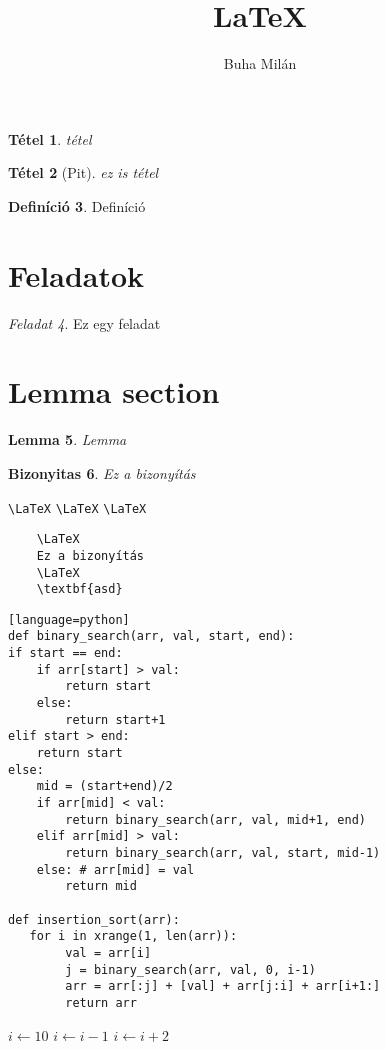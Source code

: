 \documentclass{article}
\title{\Huge{\LaTeX}}
\author{Buha Milán}
\theoremstyle{plain}
\newtheorem{tet}{Tétel}
\theoremstyle{definition}
\newtheorem{defin}[tet]{Definíció}
\theoremstyle{plain}
\newtheorem{lemma}[tet]{Lemma}
\theoremstyle{remark}
\newtheorem{feladat}[tet]{Feladat}
\theoremstyle{plain}
\newtheorem{bizonyitas}[tet]{Bizonyitas}
\begin{document}
	\maketitle
	\newpage
	
	\begin{tet}
	tétel
	\end{tet}
	
	\begin{tet}[Pit]
	ez is tétel
	\end{tet}
	
	\begin{defin}
	Definíció
	\end{defin}
	
	\section{Feladatok} \begin{feladat} Ez egy feladat \end{feladat}
	\section{Lemma section} \begin{lemma} Lemma \end{lemma}
	
	\begin{bizonyitas}
	Ez a bizonyítás
	\end{bizonyitas}
	
	\newpage
	\verb|\LaTeX| \verb|\LaTeX| \verb|\LaTeX|
	
	\begin{verbatim}
	\LaTeX
	Ez a bizonyítás
	\LaTeX
	\textbf{asd}
	\end{verbatim}
	
	\begin{lstlisting}[frame = single][language=python]
def binary_search(arr, val, start, end):
if start == end:
	if arr[start] > val:
		return start
	else:
		return start+1
elif start > end:
	return start
else: 
	mid = (start+end)/2
	if arr[mid] < val:
		return binary_search(arr, val, mid+1, end)
	elif arr[mid] > val:
		return binary_search(arr, val, start, mid-1)
	else: # arr[mid] = val
		return mid
			
def insertion_sort(arr):
   for i in xrange(1, len(arr)):
		val = arr[i]
		j = binary_search(arr, val, 0, i-1)
		arr = arr[:j] + [val] + arr[j:i] + arr[i+1:]
		return arr
	\end{lstlisting}
	
	\begin{algorithmic}
	\State $i \gets 10$
    \State $i \gets i-1$
	\Else
        	\State $i \gets i+2$
   		\EndIf
	\EndIf 
	\end{algorithmic}
\end{document}
